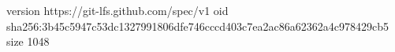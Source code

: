 version https://git-lfs.github.com/spec/v1
oid sha256:3b45c5947c53dc1327991806dfe746cccd403c7ea2ac86a62362a4c978429cb5
size 1048
